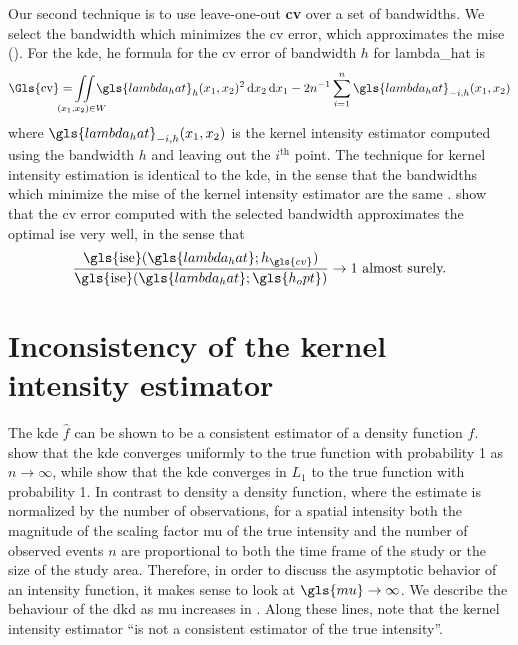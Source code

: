 Our second technique is to use leave-one-out \textbf{\gls{cv}} over a set of bandwidths.
We select the bandwidth which minimizes the \gls{cv} error,
which approximates the \gls{mise} ().
For the \gls{kde},
he formula for the \gls{cv} error of bandwidth $h$ for \gls{lambda_hat} is
\begin{equation}
    \label{eq:cverror}
    \mbox{\Gls{cv}}%
        = \iintW{\gls{lambda_hat}_h \xvec^2}
        - 2 n^{-1} \sum\limits_{i=1}^n \gls{lambda_hat}_{-i,h}\xvec%
\end{equation}
where $\gls{lambda_hat}_{-i,h}\xvec$ is the \gls{kernel intensity estimator} computed using the bandwidth $h$ and leaving out the $i^\text{th}$ point.
The technique for \gls{kernel intensity estimation} is identical to the \gls{kde},
in the sense that the bandwidths which minimize the \gls{mise} of the \gls{kernel intensity estimator} are the same \citep{brooks1991asymptotic}. 
 show that the \gls{cv} error computed with the selected bandwidth approximates the optimal \gls{ise} very well,
in the sense that
\begin{equation}
    \frac   {\mbox{\gls{ise}}(\gls{lambda_hat}; h_{\gls{cv}})}%
            {\mbox{\gls{ise}}(\gls{lambda_hat}; \gls{h_opt})}%
            \to 1 ~\text{almost surely.}%
\end{equation}

\section{Inconsistency of the kernel intensity estimator}
\label{sec:theory:inconsistency}

The \gls{kde} $\hat{f}$ can be shown to be a consistent estimator of a density function $f$.
\citet{bertrand1978convergence} show that the \gls{kde} converges uniformly to the true function with probability 1 as $n \to \infty$,
while \citet{devroye1985nonparametric} show that the \gls{kde} converges in $L_1$ to the true function with probability 1.
In contrast to density a density function,
where the estimate is normalized by the number of observations,
for a spatial intensity
both the magnitude of the scaling factor \gls{mu} of the true intensity
and the number of observed events $n$ are proportional
to both the time frame of the study or the size of the study area.
Therefore,
in order to discuss the asymptotic behavior of an intensity function,
it makes sense to look at $\gls{mu} \to \infty$.
We describe the behaviour of the \gls{dkd} as \gls{mu} increases in .
Along these lines,
\citet{guan2008consistent} note that the \gls{kernel intensity estimator}
``is not a consistent estimator of the true intensity''.

